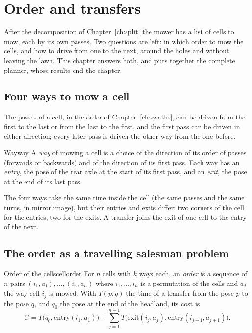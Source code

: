 \chapter{Order and transfers}
\label{ch:order}

After the decomposition of Chapter~\ref{ch:split} the mower has a list of
cells to mow, each by its own passes. Two questions are left: in which
order to mow the cells, and how to drive from one to the next, around the
holes and without leaving the lawn. This chapter answers both, and puts
together the complete planner, whose results end the chapter.

\section{Four ways to mow a cell}

The passes of a cell, in the order of Chapter~\ref{ch:swaths}, can be driven
from the first to the last or from the last to the first, and the first
pass can be driven in either direction; every later pass is driven the
other way from the one before.

\begin{definition}{Way}{way}
  A \emph{way} of mowing a cell is a choice of the direction of its order
  of passes (forwards or backwards) and of the direction of its first pass.
  Each way has an \emph{entry}, the pose of the rear axle at the start of
  its first pass, and an \emph{exit}, the pose at the end of its last pass.
\end{definition}

The four ways take the same time inside the cell (the same passes and the
same turns, in mirror image), but their entries and exits differ: two
corners of the cell for the entries, two for the exits. A transfer joins
the exit of one cell to the entry of the next.

\section{The order as a travelling salesman problem}

\begin{definition}{Order of the cells}{cellorder}
  For $n$ cells with $k$ ways each, an \emph{order} is a sequence of $n$
  pairs $(i_1, a_1), \dots, (i_n, a_n)$ where $i_1, \dots, i_n$ is a
  permutation of the cells and $a_j$ the way cell $i_j$ is mowed. With
  $T(p, q)$ the time of a transfer from the pose $p$ to the pose $q$, and
  $q_0$ the pose at the end of the headland, its cost is
  \[
    C = T\bigl(q_0, \mathrm{entry}(i_1, a_1)\bigr)
      + \sum_{j=1}^{n-1} T\bigl(\mathrm{exit}(i_j, a_j),
        \mathrm{entry}(i_{j+1}, a_{j+1})\bigr).
  \]
\end{definition}

